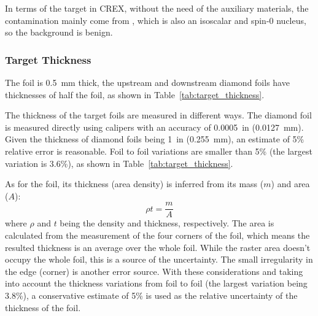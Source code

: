 In terms of the \Ca target in CREX, without the need of the auxiliary materials,
the contamination mainly come from \ca, which is also an isoscalar
and spin-0 nucleus, so the background is benign.

\subsubsection{Target Thickness}
The \Pb foil is 0.5~mm thick, the upstream and downstream diamond foils 
have thicknesses of half the \Pb foil, as shown in Table~\ref{tab:target_thickness}.

The thickness of the target foils are measured in different ways. The diamond foil 
is measured directly using calipers with an accuracy of 0.0005~in (0.0127~mm).
Given the thickness of diamond foils being 1~in (0.255~mm), an estimate of 5\% 
relative error is reasonable. Foil to foil variations are smaller than 5\% (the
largest variation is 3.6\%), as shown in Table~\ref{tab:target_thickness}.

As for the \Pb foil, its thickness (area density) is inferred from its mass ($m$)
and area ($A$):
\begin{equation}
    \rho t = \frac{m}{A}
\end{equation}
where $\rho$ and $t$ being the density and thickness, respectively.
The area is calculated from the measurement of the four corners of the \Pb foil,
which means the resulted thickness is an average over the whole foil. While
the raster area doesn't occupy the whole foil, this is a source of the uncertainty. 
The small irregularity in the edge (corner) is another error source. 
With these considerations and taking into account the thickness variations 
from foil to foil (the largest variation being 3.8\%),
a conservative estimate of 5\% is used as the
relative uncertainty of the thickness of the \Pb foil. 

